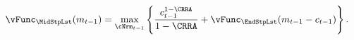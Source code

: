   \begin{equation}\begin{gathered}\begin{aligned}
        {\vFunc}_{\MidStpLst}({m}_{\prdT-1})   & = \max_{\cNrm_{\prdT-1}}
        \left\{
          \frac{{c}_{\prdT-1}^{1-\CRRA}}{1-\CRRA} +
          \vFunc_{\EndStpLst}({m}_{\prdT-1}-{c}_{\prdT-1})
        \right\}.
        \label{eq:vEndTm1}
      \end{aligned}\end{gathered}\end{equation}%
